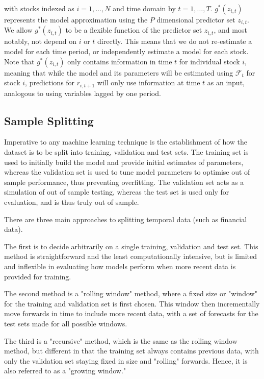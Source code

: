 \documentclass[a4paper, table]{article}
\newcommand{\smalltodo}[2][] {\todo[caption={#2}, size=\scriptsize,%
	fancyline,#1]{\begin{spacing}{.5}#2\end{spacing}}}
\newcommand{\rhs}[2][]{\smalltodo[color=green!30,#1]{{\bf RS:} #2}}
\begin{document}
with stocks indexed as $i = 1, \dots, N$ and time domain by $t = 1, \dots, T$. $g^*(z_{i,t})$ represents the model approximation using the $P$ dimensional predictor set $z_{i,t}$. We allow $g^*(z_{i,t})$ to be a flexible function of the predictor set $z_{i,t}$, and most notably, not depend on $i$ or $t$ directly. This means that we do not re-estimate a model for each time period, or independently estimate a model for each stock. Note that $g^*(z_{i,t})$ only contains information in time $t$ for individual stock $i$, meaning that while the model and its parameters will be estimated using $\mathcal{F}_t$ for stock $i$, predictions for $r_{i, t+1}$ will only use information at time $t$ as an input, analogous to using variables lagged by one period. 

\subsection{Sample Splitting}
\label{sample_split}

\rhs{unclear, re-do slightly}

Imperative to any machine learning technique is the establishment of how the dataset is to be split into training, validation and test sets. The training set is used to initially build the model and provide initial estimates of parameters, whereas the validation set is used to tune model parameters to optimise out of sample performance, thus preventing overfitting. The validation set acts as a simulation of out of sample testing, whereas the test set is used only for evaluation, and is thus truly out of sample.

There are three main approaches to splitting temporal data (such as financial data). 

The first is to decide arbitrarily on a single training, validation and test set. This method is straightforward and the least computationally intensive, but is limited and inflexible in evaluating how models perform when more recent data is provided for training. 

The second method is a "rolling window" method, where a fixed size or "window" for the training and validation set is first chosen. This window then incrementally move forwards in time to include more recent data, with a set of forecasts for the test sets made for all possible windows.

The third is a "recursive" method, which is the same as the rolling window method, but different in that the training set always contains previous data, with only the validation set staying fixed in size and "rolling" forwards. Hence, it is also referred to as a "growing window."
\end{document}
